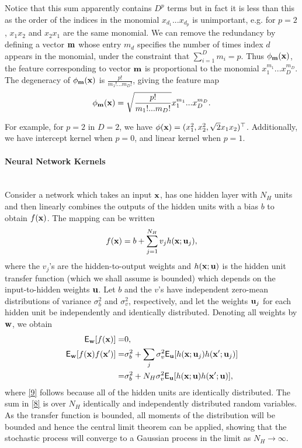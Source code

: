 \documentclass[article]{jss}
\begin{document}
Notice that this sum apparently contains $D^p$ terms but in fact it is less than this as the order of the indices in the monomial $x_{d_1}...x_{d_p}$ is unimportant, e.g. for $p=2$, $x_1x_2$ and $x_2x_1$ are the same monomial. We can remove the redundancy by defining a vector ${\bf m}$ whose entry $m_d$ specifies the number of times index $d$ appears in the monomial, under the constraint that $\sum_{i=1}^D m_i=p$. Thus $\phi_{\bf m}({\bf x})$, the feature corresponding to vector ${\bf m}$ is proportional to the monomial $x_1^{m_1}...x_D^{m_D}$. The degeneracy of $\phi_{\bf m}({\bf x})$ is $\frac{p!}{m_1!...m_D!}$, giving the feature map
\begin{align*}
\phi_{\bf m}({\bf x})=\sqrt{\frac{p!}{m_1!...m_D!}}x_1^{m_1}...x_D^{m_D}.
\end{align*}

For example, for $p=2$ in $D=2$, we have $\phi({\bf x})=(x_1^2, x_2^2, \sqrt{2}x_1x_2)^\top $. Additionally, we have intercept kernel when $p=0$, and linear kernel when $p=1$.

\paragraph{Neural Network Kernels}\mbox{}\\
Consider a network which takes an input ${\bf x}$, has one hidden layer with $N_H$ units and then linearly combines the outputs of the hidden units with a bias $b$ to obtain $f({\bf x})$. The mapping can be written
\begin{align*}
f({\bf x})=b+\sum_{j=1}^{N_H}v_j h({\bf x};{\bf u}_j),
\end{align*}
where the $v_j$'s are the hidden-to-output weights and $h({\bf x};{\bf u})$ is the hidden unit transfer function (which we shall assume is bounded) which depends on the input-to-hidden weights ${\bf u}$. Let $b$ and the $v$'s have independent zero-mean distributions of variance $\sigma_b^2$ and $\sigma_v^2$, respectively, and let the weights ${\bf u}_j$ for each hidden unit be independently and identically distributed. Denoting all weights by ${\bf w}$, we obtain
\begin{align}
\mathsf{E}_{\bf w}[f({\bf x})]=&0,\nonumber \\
\mathsf{E}_{\bf w}[f({\bf x})f({\bf x}')]=&\sigma_b^2+\sum_j \sigma_v^2 \mathsf{E}_{\bf u}[h({\bf x}; {\bf u}_j)h({\bf x}'; {\bf u}_j)] \label{8} \\
=&\sigma_b^2+N_H\sigma_v^2 \mathsf{E}_{\bf u}[h({\bf x}; {\bf u})h({\bf x}'; {\bf u})], \label{9}
\end{align}
where \eqref{9} follows because all of the hidden units are identically distributed. The sum in \eqref{8} is over $N_H$ identically and independently distributed random variables. As the transfer function is bounded, all moments of the distribution will be bounded and hence the central limit theorem can be applied, showing that the stochastic process will converge to a Gaussian process in the limit as $N_H \rightarrow \infty$.
\end{document}
